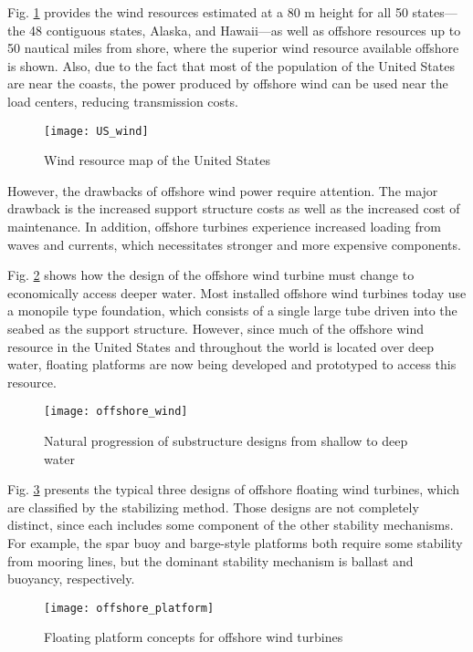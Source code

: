 \documentclass{umthesis}
\begin{document}
Fig. \ref{fig:US_wind} provides the wind resources estimated at a 80 m height for all 50 states—the 48 contiguous states, Alaska, and Hawaii—as well as offshore resources up to 50 nautical miles from shore, where the superior wind resource available offshore is shown. Also, due to the fact that most of the population of the United States are near the coasts, the power produced by offshore wind can be used near the load centers, reducing transmission costs. 

\begin{figure}
  \centering
  \texttt{[image: US\_wind]}
  \caption{Wind resource map of the United States \cite{Schwartz}}\label{fig:US_wind}
\end{figure}

However, the drawbacks of offshore wind power require attention. The major drawback is the increased support structure costs as well as the increased cost of maintenance. In addition, offshore turbines experience increased loading from waves and currents, which necessitates stronger and more expensive components.

Fig. \ref{fig:offshore_wind} shows how the design of the offshore wind turbine must change to economically access deeper water. Most installed offshore wind turbines today use a monopile type foundation, which consists of a single large tube driven into the seabed as the support structure. However, since much of the offshore wind resource in the United States and throughout the world is located over deep water, floating platforms are now being developed and prototyped to access this resource.

\begin{figure}
  \centering
  \texttt{[image: offshore\_wind]}
  \caption{Natural progression of substructure designs from shallow to deep water \cite{Jonkman}}\label{fig:offshore_wind}
\end{figure}

Fig. \ref{fig:offshore_platform} presents the typical three designs of offshore floating wind turbines, which are classified by the stabilizing method. Those designs are not completely distinct, since each includes some component of the other stability mechanisms. For example, the spar buoy and barge-style platforms both require some stability from mooring lines, but the dominant stability mechanism is ballast and buoyancy, respectively.  

\begin{figure}
  \centering
  \texttt{[image: offshore\_platform]}
  \caption{Floating platform concepts for offshore wind turbines  \cite{Jonkman}}\label{fig:offshore_platform}
\end{figure}
\end{document}
